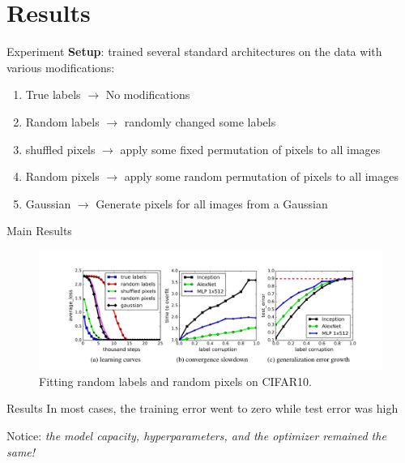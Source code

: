 \documentclass[10pt]{beamer}
\begin{document}
\section{Results}

\begin{frame}{Experiment}
	\textbf{Setup}: trained several standard architectures on the data with various modifications:
	\begin{enumerate}
		\item True labels $\rightarrow$ No modifications
		\item Random labels $\rightarrow$ randomly changed some labels
		\item shuffled pixels $\rightarrow$ apply some fixed permutation of pixels to all images
		\item Random pixels $\rightarrow$ apply some random permutation of pixels to all images
		\item Gaussian $\rightarrow$ Generate pixels for all images from a Gaussian
	\end{enumerate}

\end{frame}

\begin{frame}{Main Results}
		\begin{figure}
			\centering
		\centering
		\includegraphics[width=\linewidth]{fig1c}
		\caption{Fitting random labels and random pixels on CIFAR10.}
		\label{fig:corruptlabels}
		\end{figure}
\end{frame}

\begin{frame}{Results}
	In most cases, the training error went to zero while test error was high
	
	\begin{alertblock}{Notice:}
		\emph{the model capacity, hyperparameters, and the optimizer remained the same!}
	\end{alertblock}

\end{frame}
\end{document}
